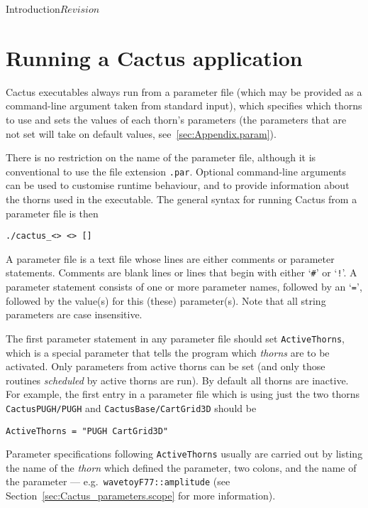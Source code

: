 \begin{cactuspart}{Introduction}{}{$Revision$}

\section{Running a Cactus application}

Cactus executables always run from a parameter file (which may be
provided as a command-line argument taken from standard input), which
specifies which thorns to use and sets the values of each thorn's 
parameters (the parameters that are not set will take on default values, 
see~\ref{sec:Appendix.param}).

There is no restriction on the name
of the parameter file, although it is conventional to use the file
extension \texttt{.par}.  Optional command-line arguments can be used
to customise runtime behaviour, and to provide information about the
thorns used in the executable. The general syntax for running Cactus from
a parameter file is then

\texttt{./cactus\_<> <>
[]}

A parameter file is a text file whose lines are either comments
or parameter statements.
Comments are blank lines or lines that begin with either
`\texttt{\#}' or `\texttt{!}'.
A parameter statement consists of one or more parameter names, followed by
an `\texttt{=}', followed by the value(s) for this (these) parameter(s).
Note that all string parameters are case insensitive.

The first parameter statement in any parameter file should set \texttt{ActiveThorns},
which is a special parameter that tells the
program which \textit{thorns} are to be activated.  Only parameters from active
thorns can be set (and only those routines \textit{scheduled} by active thorns
are run).  By default all thorns are inactive. For example, the first
entry in a parameter file which is using just the two thorns
\texttt{CactusPUGH/PUGH} and \texttt{CactusBase/CartGrid3D} should be

\texttt{ActiveThorns = "PUGH CartGrid3D"}

Parameter specifications following \texttt{ActiveThorns} usually are
carried out by listing
the name of the \textit{thorn} which defined the parameter, two colons,
and the name of the parameter --- e.g.~\texttt{wavetoyF77::amplitude}
(see Section~\ref{sec:Cactus_parameters.scope} for more information).


\end{cactuspart}
